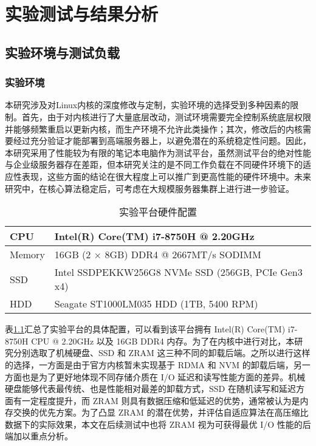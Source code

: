 
\chapter{实验测试与结果分析}

\section{实验环境与测试负载}

\subsection{实验环境}

本研究涉及对Linux内核的深度修改与定制，实验环境的选择受到多种因素的限制。首先，由于对内核进行了大量底层改动，测试环境需要完全控制系统底层权限并能够频繁重启以更新内核，而生产环境不允许此类操作；其次，修改后的内核需要经过充分验证才能部署到高端服务器上，以避免潜在的系统稳定性问题。因此，本研究采用了性能较为有限的笔记本电脑作为测试平台，虽然测试平台的绝对性能与企业级服务器存在差距，但本研究关注的是不同工作负载在不同硬件环境下的适应性表现，这些方面的结论在很大程度上可以推广到更高性能的硬件环境中。未来研究中，在核心算法稳定后，可考虑在大规模服务器集群上进行进一步验证。

\begin{table}[ht]
    \centering
    \caption{实验平台硬件配置}
    \label{tab:hardware_config}
    \begin{tabular}{ll}
        \toprule
        CPU & Intel(R) Core(TM) i7-8750H @ 2.20GHz \\
        \midrule
        Memory & 16GB (2 \(\times\) 8GB) DDR4 @ 2667MT/s SODIMM \\
        SSD & Intel SSDPEKKW256G8 NVMe SSD (256GB, PCIe Gen3 x4)  \\
        HDD & Seagate ST1000LM035 HDD (1TB, 5400 RPM) \\
        \bottomrule
    \end{tabular}
\end{table}
表\ref{tab:hardware_config}汇总了实验平台的具体配置，可以看到该平台拥有 Intel(R) Core(TM) i7-8750H CPU @ 2.20GHz 以及 16GB DDR4 内存。为了在内核中进行对比，本研究分别选取了机械硬盘、SSD 和 ZRAM 这三种不同的卸载后端。之所以进行这样的选择，一方面是由于官方内核暂未实现基于 RDMA 和 NVM 的卸载后端，另一方面也是为了更好地体现不同存储介质在 I/O 延迟和读写性能方面的差异。机械硬盘能够代表最传统、也是性能相对最差的卸载方式，SSD 在随机读写和延迟方面有一定程度提升，而 ZRAM 则具有数据压缩和低延迟的优势，通常被认为是内存交换的优先方案。为了凸显 ZRAM 的潜在优势，并评估自适应算法在高压缩比数据下的实际效果，本文在后续测试中也将 ZRAM 视为可获得最优 I/O 性能的后端加以重点分析。


